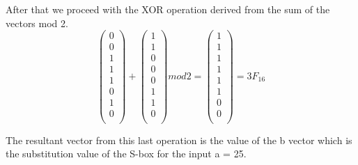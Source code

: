 \documentclass[12pt]{article}
\begin{document}
            After that we proceed with the XOR operation derived from the sum of the vectors mod 2.
            \[
                \left(
                    \begin{array}{l}
                    0 \\
                    0 \\
                    1 \\
                    1 \\
                    1 \\
                    0 \\
                    1 \\
                    0 \\
                    \end{array}
                \right)
                +
                \left(
                    \begin{array}{l}
                    1 \\
                    1 \\
                    0 \\
                    0 \\
                    0 \\
                    1 \\
                    1 \\
                    0 \\
                    \end{array}
                \right)
                mod 2 =
                \left(
                    \begin{array}{l}
                    1 \\
                    1 \\
                    1 \\
                    1 \\
                    1 \\
                    1 \\
                    0 \\
                    0 \\
                    \end{array}
                \right)
                = 3F_{16}
            \]
            
            The resultant vector from this last operation is the value of the b vector which is the substitution value of the S-box for the input a = 25.
            
\end{document}
